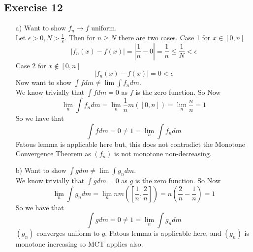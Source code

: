 \documentclass[a4paper, 12pt, twoside]{article}
\begin{document}
\subsection*{Exercise 12}
\begin{itemize}
    \item[a)]
    Want to show $f_{n}\to f$ uniform.\\
    Let $\epsilon>0, N>\frac{1}{\epsilon}$. Then for $n\geq N$ there are two cases. Case 1 for $x\in[0,n]$\\
    $$|f_{n}(x)-f(x)|=|\frac{1}{n}-0|=\frac{1}{n}\leq\frac{1}{N}<\epsilon$$
    Case 2 for $x\not\in[0,n]$
    $$|f_{n}(x)-f(x)|=0<\epsilon $$
    Now want to show $\int fdm\neq \lim\int f_{n}dm$.\\
    We know trivially that $\int fdm=0$ as $f$ is the zero function. So Now
    $$\lim_{n}\int f_{n}dm=\lim_{n}\frac{1}{n}m([0,n])=\lim_{n}\frac{n}{n}=1 $$
    So we have that
    $$ \int fdm=0\neq 1=\lim_{n}\int f_{n}dm$$
    Fatous lemma is applicable here but, this does not contradict the Monotone Convergence Theorem as $(f_{n})$ is not monotone non-decreasing.
    \item[b)]
     Want to show $\int gdm\neq \lim\int g_{n}dm$.\\
     We know trivially that $\int gdm=0$ as $g$ is the zero function. So Now
     $$\lim_{n}\int g_{n}dm=\lim_{n}nm([\frac{1}{n},\frac{2}{n}])=n(\frac{2}{n}-\frac{1}{n})=1 $$
     So we have that
     $$ \int gdm=0\neq 1=\lim_{n}\int g_{n}dm$$
     $(g_{n})$ converges uniform to $g$, Fatous lemma is applicable here, and $(g_{n})$ is monotone increasing so MCT applies also.
\end{itemize}
\end{document}
